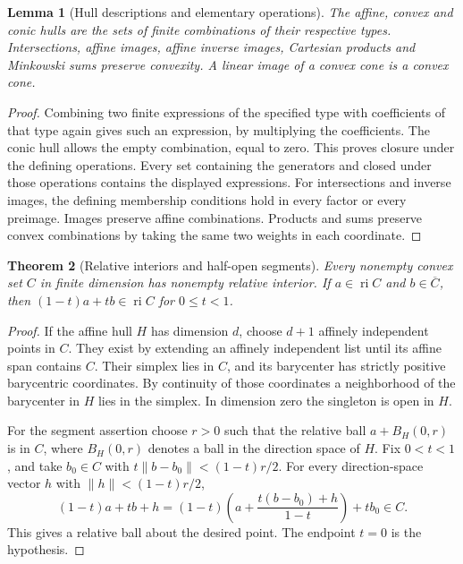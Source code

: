 \documentclass[11pt,oneside,openany]{book}
\theoremstyle{plain}
\newtheorem{theorem}{Theorem}[chapter]
\newtheorem{lemma}[theorem]{Lemma}
\theoremstyle{definition}
\theoremstyle{remark}
\begin{document}
\begin{lemma}[Hull descriptions and elementary operations]
\label{lem:hull-descriptions}
The affine, convex and conic hulls are the sets of finite combinations
of their respective types. Intersections, affine images, affine
inverse images, Cartesian products and Minkowski sums preserve convexity.
A linear image of a convex cone is a convex cone.
\end{lemma}

\begin{proof}
Combining two finite expressions of the specified type with coefficients
of that type again gives such an expression, by multiplying the
coefficients. The conic hull allows the empty combination, equal to
zero. This proves closure under the defining operations. Every set
containing the generators and closed under those operations contains
the displayed expressions. For intersections and inverse images,
the defining membership conditions hold in every factor or every
preimage. Images preserve affine combinations. Products and sums
preserve convex combinations by taking the same two weights in
each coordinate.
\end{proof}

\begin{theorem}[Relative interiors and half-open segments]
\label{thm:relative-segment}
Every nonempty convex set \(C\) in finite dimension has nonempty
relative interior. If \(a\in\operatorname{ri}C\) and
\(b\in\overline C\), then \((1-t)a+tb\in\operatorname{ri}C\)
for \(0\leq t<1\).
\end{theorem}

\begin{proof}
If the affine hull \(H\) has dimension \(d\), choose \(d+1\)
affinely independent points in \(C\). They exist by extending an
affinely independent list until its affine span contains \(C\).
Their simplex lies in \(C\), and its barycenter has strictly positive
barycentric coordinates. By continuity of those coordinates a
neighborhood of the barycenter in \(H\) lies in the simplex. In
dimension zero the singleton is open in \(H\).

For the segment assertion choose \(r>0\) such that the relative
ball \(a+B_H(0,r)\) is in \(C\), where \(B_H(0,r)\) denotes a
ball in the direction space of \(H\). Fix \(0<t<1\), and take
\(b_0\in C\) with \(t\lVert b-b_0\rVert<(1-t)r/2\).
For every direction-space vector \(h\) with
\(\lVert h\rVert<(1-t)r/2\),
\[
 (1-t)a+tb+h
  =(1-t)\left(a+\frac{t(b-b_0)+h}{1-t}\right)+t b_0 \in C.
\]
This gives a relative ball about the desired point. The endpoint
\(t=0\) is the hypothesis.
\end{proof}
\end{document}

